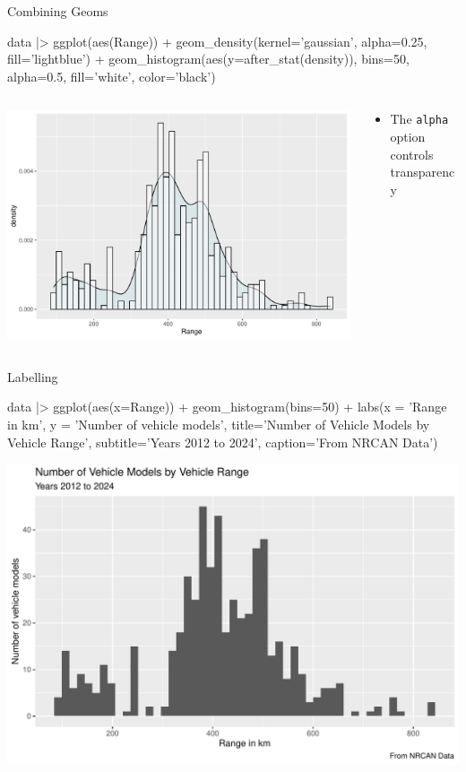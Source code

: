 \documentclass[ignorenonframetext,xcolor=x11names]{beamer}
\begin{document}
\begin{frame}[fragile]{Combining Geoms}
\begin{Rcode}
data |> ggplot(aes(Range)) +
    geom_density(kernel='gaussian', 
        alpha=0.25, fill='lightblue') +
    geom_histogram(aes(y=after_stat(density)), bins=50, 
        alpha=0.5, fill='white', color='black')
\end{Rcode}
\begin{columns}
\begin{column}{.75\textwidth}
  \includegraphics[width=\textwidth]{fuel.histogram.pdf}
\end{column}
\begin{column}{.35\textwidth}
\footnotesize
\begin{itemize}
    \item The \texttt{alpha} option controls transparency
\end{itemize}
\end{column}
\end{columns}
\end{frame}

\begin{frame}[fragile]{Labelling}
\begin{Rcode}
data |>  ggplot(aes(x=Range)) + 
    geom_histogram(bins=50) +
    labs(x = 'Range in km',
         y = 'Number of vehicle models',
         title='Number of Vehicle Models by Vehicle Range',
         subtitle='Years 2012 to 2024',
         caption='From NRCAN Data')
\end{Rcode}
\begin{center}
  \includegraphics[width=.7\textwidth]{fuel.histogram.labels.pdf}
\end{center}
\end{frame}
\end{document}
